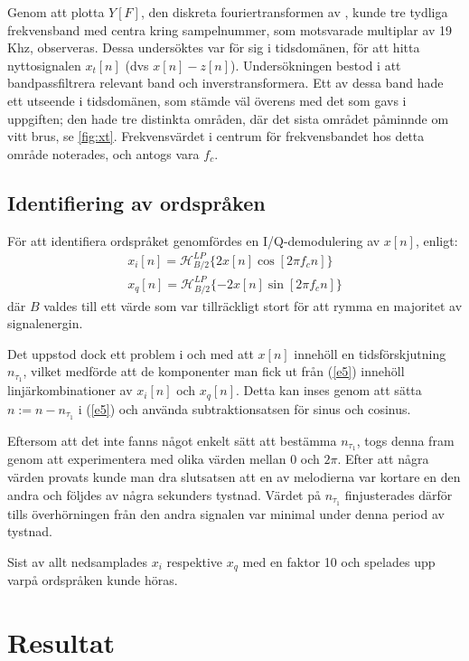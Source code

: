 \documentclass[10pt,twocolumn]{article}
\begin{document}
Genom att plotta $Y[F]$, den diskreta fouriertransformen av \yhat, kunde tre tydliga frekvensband med
centra kring sampelnummer, som motsvarade multiplar av 19 Khz, observeras.
Dessa undersöktes var för sig i tidsdomänen, för att hitta nyttosignalen $x_t[n]$ (dvs $x[n] - z[n]$).
Undersökningen bestod i att bandpassfiltrera relevant band och inverstransformera. Ett av
dessa band hade ett utseende i tidsdomänen, som stämde väl överens med det som gavs i uppgiften; den
hade tre distinkta områden, där det sista området påminnde om vitt brus, se \ref{fig:xt}. Frekvensvärdet i centrum för
frekvensbandet hos detta område noterades, och antogs vara $f_c$.

\subsection{Identifiering av ordspråken}

För att identifiera ordspråket genomfördes en I/Q-demodulering av $x[n]$, enligt:
\begin{multline}
    x_i[n] = \mathcal{H}_{B/2}^{LP} \{ 2 x[n] \cos[2 \pi f_c n] \} \\
    x_q[n] = \mathcal{H}_{B/2}^{LP} \{ -2 x[n] \sin[2 \pi f_c n] \}
    \label{e5}
\end{multline}
där $B$ valdes till ett värde som var tillräckligt stort för att rymma en majoritet
av signalenergin.

Det uppstod dock ett problem i och med att $x[n]$ innehöll en tidsförskjutning $n_{\tau_1}$,
vilket medförde att de komponenter man fick ut från (\ref{e5}) innehöll
linjärkombinationer av $x_i[n]$ och $x_q[n]$. Detta kan inses genom att sätta $n := n - n_{\tau_1}$
i (\ref{e5}) och använda subtraktionsatsen för sinus och cosinus.

Eftersom att det inte fanns något enkelt sätt att bestämma $n_{\tau_1}$, togs denna fram genom
att experimentera med olika värden mellan $0$ och $2 \pi$. Efter att några värden provats
kunde man dra slutsatsen att en av melodierna var kortare en den andra och följdes av några
sekunders tystnad. Värdet på $n_{\tau_1}$ finjusterades därför tills överhörningen från den
andra signalen var minimal under denna period av tystnad.

Sist av allt nedsamplades $x_i$ respektive $x_q$ med en faktor 10 och spelades upp varpå
ordspråken kunde höras.
\section{Resultat}
\end{document}
